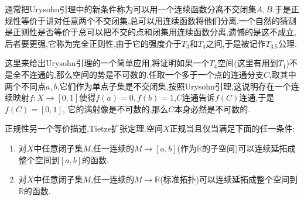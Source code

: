通常把Urysohn引理中的新条件称为可以用一个连续函数分离不交闭集$A,B$.于是正规性等价于讲对任意两个不交闭集,总可以用连续函数将他们分离.一个自然的猜测是正则性是否等价于总可以把不交的点和闭集用连续函数分离,遗憾的是这不成立,后者要更强,它称为完全正则性,由于它的强度介于$T_3$和$T_4$之间,于是被记作$T_{3.5}$公理.

这里来给出Urysohn引理的一个简单应用,将证明如果一个$T_4$空间(这里有用到$T_1$)不是全不连通的,那么空间的势是不可数的.任取一个多于一个点的连通分支$C$,取其中两个不同点$a,b$,它们作为单点子集是不交闭集,按照Urysohn引理,这说明存在一个连续映射$f:X\to[0,1]$使得$f(a)=0,f(b)=1$,$C$连通告诉$f(C)$连通,于是$f(C)= [0,1]$, 它的满射像是不可数的,那么$C$本身必然是不可数的.

正规性另一个等价描述,Tietze扩张定理.空间$X$正规当且仅当满足下面的任一条件:
\begin{enumerate}
	\item 对$X$中任意闭子集$M$,任一连续的$M\to [a,b]$(作为$\mathbb{R}$的子空间)可以连续延拓成整个空间到$[a,b]$的函数.
	\item 对$X$中任意闭子集$M$,任一连续的$M\to\mathbb{R}$(标准拓扑)可以连续延拓成整个空间到$\mathbb{R}$的函数.
\end{enumerate}

